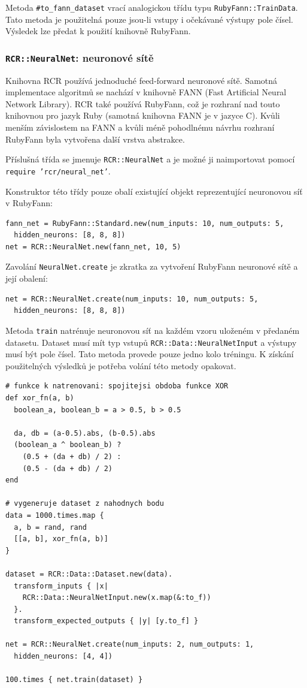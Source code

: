 \documentclass[a4paper]{article}
\begin{document}
Metoda \texttt{\#to\_fann\_dataset} vrací analogickou třídu typu
\texttt{RubyFann::TrainData}. Tato metoda je použitelná pouze jsou-li vstupy i
očekávané výstupy pole čísel. Výsledek lze předat k použití knihovně RubyFann.

\subsubsection{\texttt{RCR::NeuralNet}: neuronové sítě}
Knihovna RCR používá jednoduché feed-forward neuronové sítě. Samotná
implementace algoritmů se nachází v knihovně FANN (Fast Artificial Neural
Network Library\cite{nissen03}). RCR také používá RubyFann, což je rozhraní nad touto knihovnou
pro jazyk Ruby (samotná knihovna FANN je v jazyce C). Kvůli menším závislostem
na FANN a kvůli méně pohodlnému návrhu rozhraní RubyFann byla vytvořena další
vrstva abstrakce.

Příslušná třída se jmenuje \texttt{RCR::NeuralNet} a je možné ji naimportovat
pomocí \texttt{require 'rcr/neural\_net'}.

Konstruktor této třídy pouze obalí existující objekt reprezentující neuronovou
síť v RubyFann:
\begin{lstlisting}
fann_net = RubyFann::Standard.new(num_inputs: 10, num_outputs: 5,
  hidden_neurons: [8, 8, 8])
net = RCR::NeuralNet.new(fann_net, 10, 5)
\end{lstlisting}

Zavolání \texttt{NeuralNet.create} je zkratka za vytvoření RubyFann neuronové
sítě a její obalení:
\begin{lstlisting}
net = RCR::NeuralNet.create(num_inputs: 10, num_outputs: 5,
  hidden_neurons: [8, 8, 8])
\end{lstlisting}

Metoda \texttt{train} natrénuje neuronovou síť na každém vzoru uloženém
v předaném datasetu. Dataset musí mít typ vstupů \texttt{RCR::Data::NeuralNetInput} a
výstupy musí být pole čísel. Tato metoda provede pouze jedno kolo tréningu.
K získání použitelných výsledků je potřeba volání této metody opakovat.
\begin{lstlisting}
# funkce k natrenovani: spojitejsi obdoba funkce XOR
def xor_fn(a, b)
  boolean_a, boolean_b = a > 0.5, b > 0.5

  da, db = (a-0.5).abs, (b-0.5).abs
  (boolean_a ^ boolean_b) ?
    (0.5 + (da + db) / 2) :
    (0.5 - (da + db) / 2)
end

# vygeneruje dataset z nahodnych bodu
data = 1000.times.map {
  a, b = rand, rand
  [[a, b], xor_fn(a, b)]
}

dataset = RCR::Data::Dataset.new(data).
  transform_inputs { |x|
    RCR::Data::NeuralNetInput.new(x.map(&:to_f))
  }.
  transform_expected_outputs { |y| [y.to_f] }

net = RCR::NeuralNet.create(num_inputs: 2, num_outputs: 1,
  hidden_neurons: [4, 4])

100.times { net.train(dataset) }
\end{lstlisting}
\end{document}
